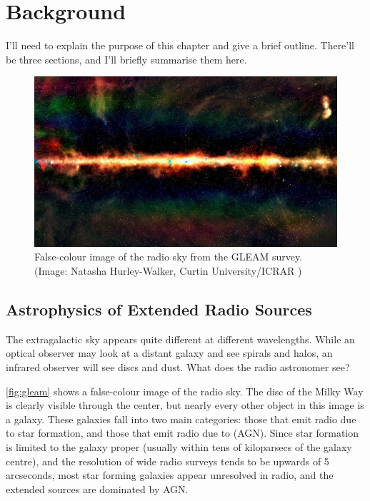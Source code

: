 \chapter{Background}
\label{cha:background}

I'll need to explain the purpose of this chapter and give a brief outline. There'll be three sections, and I'll briefly summarise them here.

    \begin{figure}[ht]
        \includegraphics[width=\textwidth]{images/gleam.jpg}
        \caption{\label{fig:gleam} False-colour image of the radio sky from the GLEAM survey. (Image: Natasha Hurley-Walker, Curtin University/ICRAR \citeneeded)}
    \end{figure}

\section{Astrophysics of Extended Radio Sources}
\label{sec:physics-of-radio-sources}


    The extragalactic sky appears quite different at different wavelengths. While an optical observer may look at a distant galaxy and see spirals and halos, an infrared observer will see discs and dust. What does the radio astronomer see? 

    \autoref{fig:gleam} shows a false-colour image of the radio sky. The disc of the Milky Way is clearly visible through the center, but nearly every other object in this image is a galaxy. These galaxies fall into two main categories: those that emit radio due to star formation, and those that emit radio due to  (AGN). Since star formation is limited to the galaxy proper (usually within tens of kiloparsecs of the galaxy centre), and the resolution of wide radio surveys tends to be upwards of 5 arcseconds, most star forming galaxies appear unresolved in radio, and the extended sources are dominated by AGN.

